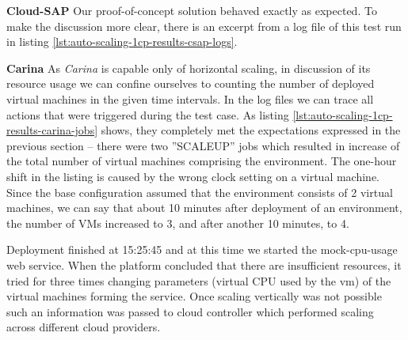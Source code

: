 \begin{asparaenum}

  \item[\textbf{Cloud-SAP}] Our proof-of-concept solution behaved exactly as expected. To make the discussion more clear, there is an excerpt from a log file of this test run in listing \ref{lst:auto-scaling-1cp-results-csap-logs}. 


\item[\textbf{Carina}] As \emph{Carina} is capable only of horizontal scaling, in discussion of its resource usage we can confine ourselves to counting the number of deployed virtual machines in the given time intervals. In the log files we can trace all actions that were triggered during the test case. As listing \ref{lst:auto-scaling-1cp-results-carina-jobs} shows, they completely met the expectations expressed in the previous section -- there were two ''SCALEUP'' jobs which resulted in increase of the total number of virtual machines comprising the environment. The one-hour shift in the listing is caused by the wrong clock setting on a virtual machine.  
Since the base configuration assumed that the environment consists of 2 virtual machines, we can say that about 10 minutes after deployment of an environment, the number of VMs increased to 3, and after another 10 minutes, to 4.

Deployment finished at 15:25:45 and at this time we started the mock-cpu-usage web service. When the platform concluded that there are insufficient resources, it tried for three times changing parameters (virtual CPU used by the vm) of the virtual machines forming the service. Once scaling vertically was not possible such an information was passed to cloud controller which performed scaling across different cloud providers.
\end{asparaenum}

